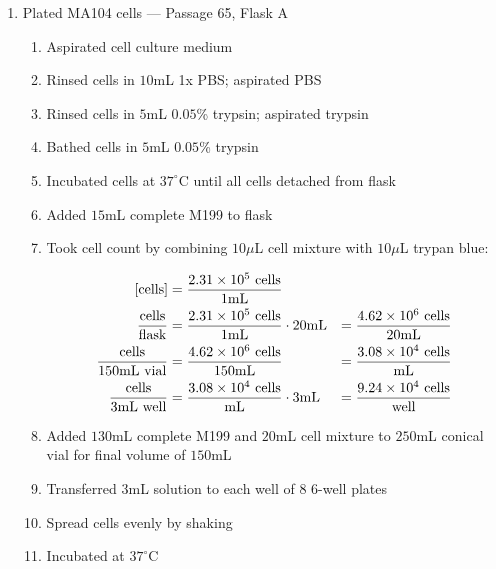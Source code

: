 \begin{enumerate}
	\item Plated MA104 cells --- Passage 65, Flask A
		\begin{enumerate}
			\item Aspirated cell culture medium
			\item Rinsed cells in $10$mL 1x PBS; aspirated PBS
			\item Rinsed cells in $5$mL $0.05$\% trypsin; aspirated trypsin
			\item Bathed cells in $5$mL $0.05$\% trypsin
			\item Incubated cells at $37^{\circ}$C until all cells detached from flask
			\item Added $15$mL complete M199 to flask
			\item Took cell count by combining $10\mu$L cell mixture with $10\mu$L trypan blue:
			
				\begin{align*}
				\text{[cells]} &= \frac{2.31\times 10^{5}\text{ cells}}{1\text{mL}} \\
				\frac{\text{cells}}{\text{flask}} &= \frac{2.31\times 10^{5}\text{ cells}}{1\text{mL}} \cdot 20\text{mL} &= \frac{4.62\times 10^{6}\text{ cells}}{20\text{mL}}\\
				\frac{\text{cells}}{150\text{mL vial}} &= \frac{4.62\times 10^{6}\text{ cells}}{150\text{mL}} &= \frac{3.08\times 10^{4}\text{ cells}}{\text{mL}}\\
				\frac{\text{cells}}{3\text{mL well}} &= \frac{3.08\times 10^{4}\text{ cells}}{\text{mL}} \cdot 3\text{mL} &= \frac{9.24\times 10^{4}\text{ cells}}{\text{well}}\\
				\end{align*}
			\item Added $130$mL complete M199 and $20$mL cell mixture to $250$mL conical vial for final volume of $150$mL
			\item Transferred $3$mL solution to each well of 8 6-well plates
			\item Spread cells evenly by shaking
			\item Incubated at $37^{\circ}$C
		\end{enumerate}
\end{enumerate}

% 

%
% 

